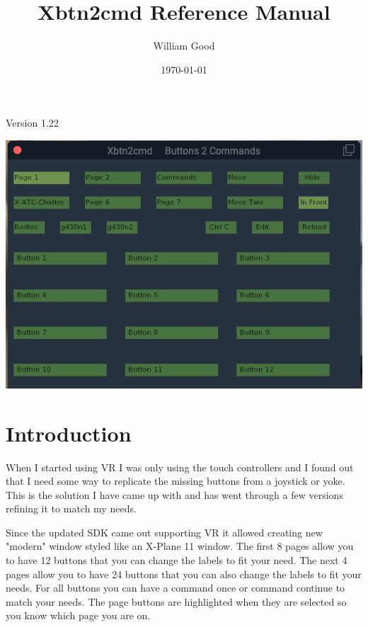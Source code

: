 \documentclass[11pt,parskip=half,a4paper]{scrartcl}
\begin{document}
\title{Xbtn2cmd Reference Manual}
\author{William Good}
\date{\today}
\maketitle

\begin{center}
Version 1.22
\end{center}

\begin{center}
\includegraphics[width=15cm]{../pics/Xbtn2cmd_Page1.jpg}
\end{center}



\thispagestyle{empty}
\newpage
\verb||
\tableofcontents

\newpage
\section{Introduction}

When I started using VR I was only using the touch controllers and I found out that I need some way to replicate the missing buttons from a joystick or yoke. This is the solution I have came up with and has went through a few versions refining it to match my needs. \newline

Since the updated SDK came out supporting VR it allowed creating new "modern" window styled like an X-Plane 11 window. The first 8 pages allow you to have 12 buttons that you can change the labels to fit your need. The next 4 pages allow you to have 24 buttons that you can also change the labels to fit your needs. For all buttons you can have a command once or command continue to match your needs. The page buttons are highlighted when they are selected so you know which page you are on. 
\end{document}
